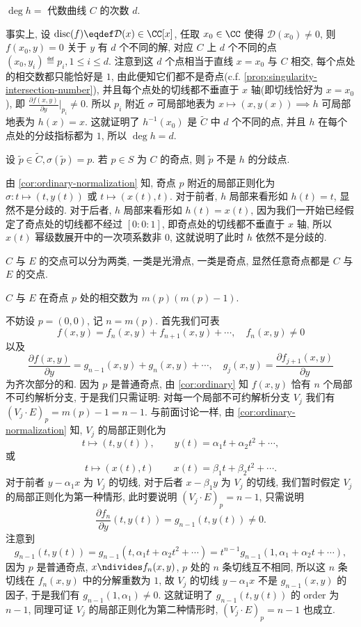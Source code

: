 \begin{claim}
    $\deg h =$ 代数曲线 $C$ 的次数 $d$.
\end{claim}

事实上, 设 $\mathrm{disc}(f) \eqdef \mathcal{D}(x) \in \CC[x]$,
任取 $x_0 \in \CC$ 使得 $\mathcal{D}(x_0) \ne 0$,
则 $f(x_0,y) = 0$ 关于 $y$ 有 $d$ 个不同的解,
对应 $C$ 上 $d$ 个不同的点 $(x_0,y_i) \eqdef p_i, 1 \le i \le d$.
注意到这 $d$ 个点相当于直线 $x = x_0$ 与 $C$ 相交,
每个点处的相交数都只能恰好是 $1$,
由此便知它们都不是奇点(c.f. \cref{prop:singularity-intersection-number}),
并且每个点处的切线都不垂直于 $x$ 轴(即切线恰好为 $x = x_0$),
即 $\frac{\partial f(x,y)}{\partial y}|_{p_i} \ne 0$.
所以 $p_i$ 附近 $\sigma$ 可局部地表为 $x \mapsto (x,y(x)) \implies h$
可局部地表为 $h(x) = x$.
这就证明了 $h^{-1}(x_0)$ 是 $\tilde{C}$ 中 $d$ 个不同的点,
并且 $h$ 在每个点处的分歧指标都为 $1$, 所以 $\deg h = d$.

\begin{claim}
设 $\tilde{p} \in \tilde{C}, \sigma(\tilde{p}) = p$.
若 $p \in S$ 为 $C$ 的奇点, 则 $\tilde{p}$ 不是 $h$ 的分歧点.
\end{claim}

由 \cref{cor:ordinary-normalization} 知,
奇点 $p$ 附近的局部正则化为 $\sigma: t \mapsto (t,y(t))$
或 $t \mapsto (x(t),t)$.
对于前者, $h$ 局部来看形如 $h(t) = t$, 显然不是分歧的.
对于后者, $h$ 局部来看形如 $h(t) = x(t)$,
因为我们一开始已经假定了奇点处的切线都不经过 $[0:0:1]$,
即奇点处的切线都不垂直于 $x$ 轴,
所以 $x(t)$ 幂级数展开中的一次项系数非 $0$,
这就说明了此时 $h$ 依然不是分歧的.

$C$ 与 $E$ 的交点可以分为两类,
一类是光滑点, 一类是奇点,
显然任意奇点都是 $C$ 与 $E$ 的交点.

\begin{claim}
$C$ 与 $E$ 在奇点 $p$ 处的相交数为 $m(p)(m(p) - 1)$.
\end{claim}

不妨设 $p = (0,0)$, 记 $n = m(p)$. 首先我们可表
\[f(x,y) = f_n(x,y) + f_{n+1}(x,y) + \cdots, \quad f_n(x,y) \ne 0\]
以及
\[\frac{\partial f(x,y)}{\partial y} = g_{n-1}(x,y) + g_n(x,y) + \cdots, \quad g_j(x,y) = \frac{\partial f_{j+1}(x,y)}{\partial y}\]
为齐次部分的和.
因为 $p$ 是普通奇点, 由 \cref{cor:ordinary} 知
$f(x,y)$ 恰有 $n$ 个局部不可约解析分支,
于是我们只需证明:
对每一个局部不可约解析分支 $V_j$ 我们有 $(V_j\cdot E)_p = m(p) - 1 = n - 1$.
与前面讨论一样, 由 \cref{cor:ordinary-normalization} 知,
$V_j$ 的局部正则化为
\[t \mapsto (t,y(t)),\qquad y(t) = \alpha_1t + \alpha_2t^2 + \cdots,\]
或
\[t \mapsto (x(t),t) \qquad x(t) = \beta_1t + \beta_2t^2 + \cdots.\]
对于前者 $y - \alpha_1x$ 为 $V_j$ 的切线,
对于后者 $x - \beta_1y$ 为 $V_j$ 的切线,
我们暂时假定 $V_j$ 的局部正则化为第一种情形,
此时要说明 $(V_j\cdot E)_p = n - 1$, 只需说明
\[\frac{\partial f_n}{\partial y}(t,y(t)) = g_{n-1}(t,y(t)) \ne 0.\]
注意到
\[g_{n-1}(t,y(t)) = g_{n-1}(t,\alpha_1t+\alpha_2t^2 + \cdots) = t^{n-1}g_{n-1}(1,\alpha_1 + \alpha_2t+\cdots),\]
因为 $p$ 是普通奇点, $x \ndivides f_n(x,y)$, $p$ 处的 $n$ 条切线互不相同,
所以这 $n$ 条切线在 $f_n(x,y)$ 中的分解重数为 $1$,
故 $V_j$ 的切线 $y - \alpha_1x$ 不是 $g_{n-1}(x,y)$ 的因子,
于是我们有 $g_{n-1}(1,\alpha_1) \ne 0$.
这就证明了 $g_{n-1}(t,y(t))$ 的 order 为 $n - 1$,
同理可证 $V_j$ 的局部正则化为第二种情形时,
$(V_j\cdot E)_p = n - 1$ 也成立.

